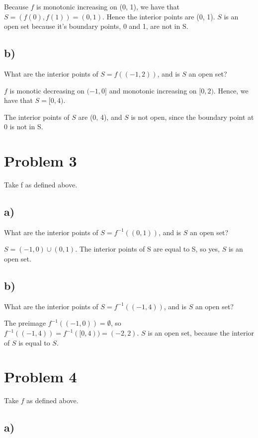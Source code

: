 \documentclass{article}
\begin{document}
Because $f$ is monotonic increasing on (0, 1), we have that $S = (f(0), f(1)) = (0, 1)$. 
Hence the interior points are (0, 1). 
$S$ is an open set because it's boundary points, 0 and 1, are not in S.  

\subsection*{b)}

What are the interior points of $S = f((-1, 2))$, and is $S$ an open set?

$f$ is monotic decreasing on $(-1, 0]$ and monotonic increasing on $[0, 2)$. 
Hence, we have that $S = [0, 4)$. 

The interior points of $S$ are (0, 4), and $S$ is not open, since the boundary point at 0 is not in S.  

\section*{Problem 3}

Take f as defined above. 

\subsection*{a)}

What are the interior points of $S = f^{-1}((0, 1))$, and is $S$ an open set?

$S = (-1, 0) \cup (0, 1)$. 
The interior points of S are equal to S, so yes, $S$ is an open set. 

\subsection*{b)}

What are the interior points of $S = f^{-1}((-1, 4))$, and is $S$ an open set?

The preimage $f^{-1}((-1, 0)) = \emptyset$, so $f^{-1}((-1, 4)) = f^{-1}([0, 4)) = (-2, 2)$. 
$S$ is an open set, because the interior of $S$ is equal to $S$.  

\section*{Problem 4}

Take $f$ as defined above. 

\subsection*{a)}
\end{document}
